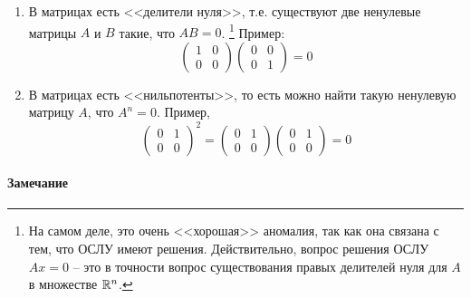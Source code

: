 \begin{enumerate}
\item В матрицах есть <<делители нуля>>, т.е. существуют две ненулевые матрицы $A$ и $B$ такие, что $AB = 0$.%
\footnote{На самом деле, это очень <<хорошая>> аномалия, так как она связана с тем, что ОСЛУ имеют решения.
Действительно, вопрос решения ОСЛУ $Ax = 0$ -- это в точности вопрос существования правых делителей нуля для $A$ в множестве $\mathbb R^{n}$.}
Пример:
\[
\begin{pmatrix}
{1}&{0}\\
{0}&{0}
\end{pmatrix}
\begin{pmatrix}
{0}&{0}\\
{0}&{1}
\end{pmatrix}
=0
\]

\item В матрицах есть <<нильпотенты>>, то есть можно найти такую ненулевую матрицу $A$, что $A^n=0$.
Пример, 
\[
\begin{pmatrix}
{0}&{1}\\
{0}&{0}
\end{pmatrix}^2
=
\begin{pmatrix}
{0}&{1}\\
{0}&{0}
\end{pmatrix}
\begin{pmatrix}
{0}&{1}\\
{0}&{0}
\end{pmatrix}
=0
\]
\end{enumerate}

\paragraph{Замечание}

